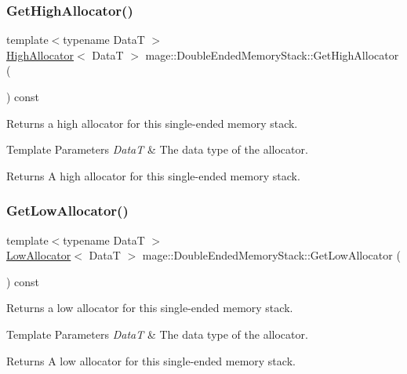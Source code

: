 \subsubsection{\texorpdfstring{Get\+High\+Allocator()}{GetHighAllocator()}}
{\footnotesize\ttfamily template$<$typename DataT $>$ \\
\hyperlink{structmage_1_1_double_ended_memory_stack_1_1_high_allocator}{High\+Allocator}$<$ DataT $>$ mage\+::\+Double\+Ended\+Memory\+Stack\+::\+Get\+High\+Allocator (\begin{DoxyParamCaption}{ }\end{DoxyParamCaption}) const\hspace{0.3cm}{\ttfamily [noexcept]}}

Returns a high allocator for this single-\/ended memory stack.


\begin{DoxyTemplParams}{Template Parameters}
{\em DataT} & The data type of the allocator. \\
\hline
\end{DoxyTemplParams}
\begin{DoxyReturn}{Returns}
A high allocator for this single-\/ended memory stack. 
\end{DoxyReturn}
\hypertarget{classmage_1_1_double_ended_memory_stack_a9ca15b7e92e19744db2b3c9862062006}{}\label{classmage_1_1_double_ended_memory_stack_a9ca15b7e92e19744db2b3c9862062006} 
\subsubsection{\texorpdfstring{Get\+Low\+Allocator()}{GetLowAllocator()}}
{\footnotesize\ttfamily template$<$typename DataT $>$ \\
\hyperlink{structmage_1_1_double_ended_memory_stack_1_1_low_allocator}{Low\+Allocator}$<$ DataT $>$ mage\+::\+Double\+Ended\+Memory\+Stack\+::\+Get\+Low\+Allocator (\begin{DoxyParamCaption}{ }\end{DoxyParamCaption}) const\hspace{0.3cm}{\ttfamily [noexcept]}}

Returns a low allocator for this single-\/ended memory stack.


\begin{DoxyTemplParams}{Template Parameters}
{\em DataT} & The data type of the allocator. \\
\hline
\end{DoxyTemplParams}
\begin{DoxyReturn}{Returns}
A low allocator for this single-\/ended memory stack. 
\end{DoxyReturn}
\hypertarget{classmage_1_1_double_ended_memory_stack_a68d69d69243d5ef8a9fd12b7d7a42993}{}\label{classmage_1_1_double_ended_memory_stack_a68d69d69243d5ef8a9fd12b7d7a42993} 
